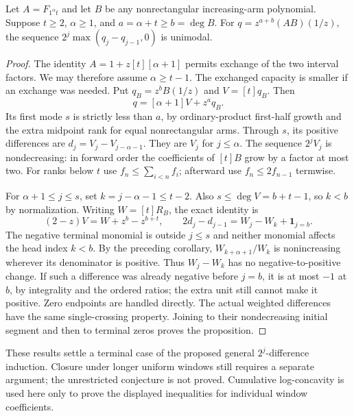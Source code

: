 \begin{proposition}
Let $A=F_{1^\alpha t}$ and let $B$ be any nonrectangular
increasing-arm polynomial. Suppose $t\ge2$, $\alpha\ge1$,
and $a=\alpha+t\ge b=\deg B$. For $q=z^{a+b}(AB)(1/z)$,
the sequence $2^j\max(q_j-q_{j-1},0)$ is unimodal.
\end{proposition}
\begin{proof}
The identity $A=1+z[t][\alpha+1]$ permits exchange of the
two interval factors. We may therefore assume $\alpha\ge t-1$.
The exchanged capacity is smaller if an exchange was needed.
Put $q_B=z^bB(1/z)$ and $V=[t]q_B$. Then
\[
 q=[\alpha+1]V+z^a q_B.
\]
Its first mode $s$ is strictly less than $a$, by ordinary-product
first-half growth and the extra midpoint rank for equal nonrectangular
arms. Through $s$, its positive differences are
$d_j=V_j-V_{j-\alpha-1}$. They are $V_j$ for $j\le\alpha$.
The sequence $2^jV_j$ is nondecreasing: in forward order the
coefficients of $[t]B$ grow by a factor at most two. For ranks
below $t$ use $f_n\le\sum_{i<n}f_i$; afterward use
$f_n\le2f_{n-1}$ termwise.

For $\alpha+1\le j\le s$, set $k=j-\alpha-1\le t-2$.
Also $s\le\deg V=b+t-1$, so $k<b$ by normalization.
Writing $W=[t]R_B$, the exact identity is
\[
 (2-z)V=W+z^b-z^{b+t},\qquad
 2d_j-d_{j-1}=W_j-W_k+\mathbf1_{j=b}.
\]
The negative terminal monomial is outside $j\le s$ and neither
monomial affects the head index $k<b$. By the preceding corollary,
$W_{k+\alpha+1}/W_k$ is nonincreasing wherever its denominator
is positive. Thus $W_j-W_k$ has no negative-to-positive change.
If such a difference was already negative before $j=b$, it is
at most $-1$ at $b$, by integrality and the ordered ratios; the
extra unit still cannot make it positive. Zero endpoints are
handled directly. The actual weighted differences have the same
single-crossing property. Joining to their nondecreasing initial
segment and then to terminal zeros proves the proposition.
\end{proof}

These results settle a terminal case of the proposed general
$2^j$-difference induction. Closure under longer uniform windows
still requires a separate argument; the unrestricted conjecture
is not proved. Cumulative log-concavity is used here only to prove
the displayed inequalities for individual window coefficients.
